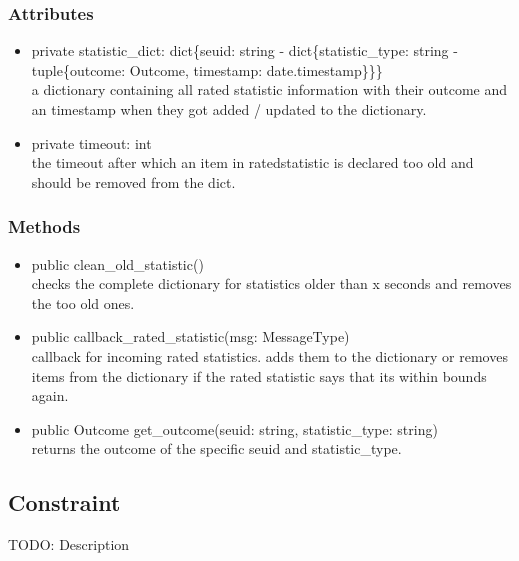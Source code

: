 \subsubsection{Attributes}
\begin{itemize}
	\item private statistic\_dict: dict\{seuid: string - dict\{statistic\_type: string - tuple\{outcome: Outcome, timestamp: date.timestamp\}\}\} \\
		a dictionary containing all rated statistic information with their outcome and an timestamp when they got added / updated to the dictionary.
	\item private timeout: int\\
		the timeout after which an item in ratedstatistic is declared too old and should be removed from the dict.
\end{itemize}
\subsubsection{Methods}
\begin{itemize}
	\item  public clean\_old\_statistic()\\
		checks the complete dictionary for statistics older than x seconds and removes the too old ones.
	\item public callback\_rated\_statistic(msg: MessageType)\\
		callback for incoming rated statistics. adds them to the dictionary or removes items from the dictionary if the rated statistic says that its within bounds again. 
	\item public Outcome get\_outcome(seuid: string, statistic\_type: string)\\
		returns the outcome of the specific seuid and statistic\_type.
\end{itemize}

\subsection{Constraint }
TODO: Description


